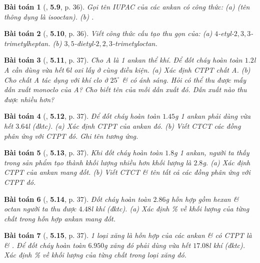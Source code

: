 \documentclass{article}
\numberwithin{equation}{section}
\newtheorem{baitoan}{Bài toán}[section]
\begin{document}
\begin{baitoan}[\cite{SBT_Hoa_Hoc_11_co_ban}, \textbf{5.9}, p. 36]
	Gọi tên IUPAC của các ankan có công thức: (a) \emph{} (tên thông dụng là \emph{isooctan}). (b) \emph{}.
\end{baitoan}

\begin{baitoan}[\cite{SBT_Hoa_Hoc_11_co_ban}, \textbf{5.10}, p. 36]
	Viết công thức cấu tạo thu gọn của: (a) $4$-etyl-$2,3,3$-trimetylheptan. (b) $3,5$-đietyl-$2,2,3$-trimetyloctan.
\end{baitoan}

\begin{baitoan}[\cite{SBT_Hoa_Hoc_11_co_ban}, \textbf{5.11}, p. 37]
	Cho A là 1 ankan thể khí. Để đốt cháy hoàn toàn $1.2$\emph{l} A cần dùng vừa hết $6$\emph{l} oxi lấy ở cùng điều kiện. (a) Xác định CTPT chất A. (b) Cho chất A tác dụng với khí clo ở $25^\circ$ \& có ánh sáng. Hỏi có thể thu được mấy dẫn xuất monoclo của A? Cho biết tên của mỗi dẫn xuất đó. Dẫn xuất nào thu được nhiều hơn?
\end{baitoan}

\begin{baitoan}[\cite{SBT_Hoa_Hoc_11_co_ban}, \textbf{5.12}, p. 37]
	Để đốt cháy hoàn toàn $1.45$\emph{g} 1 ankan phải dùng vừa hết $3.64$\emph{l} \emph{} (đktc). (a) Xác định CTPT của ankan đó. (b) Viết CTCT các đồng phân ứng với CTPT đó. Ghi tên tương ứng.
\end{baitoan}

\begin{baitoan}[\cite{SBT_Hoa_Hoc_11_co_ban}, \textbf{5.13}, p. 37]
	Khi đốt cháy hoàn toàn $1.8$\emph{g} 1 ankan, người ta thấy trong sản phẩm tạo thành khối lượng \emph{} nhiều hơn khối lượng \emph{} là $2.8$\emph{g}. (a) Xác định CTPT của ankan mang đốt. (b) Viết CTCT \& tên tất cả các đồng phân ứng với CTPT đó.
\end{baitoan}

\begin{baitoan}[\cite{SBT_Hoa_Hoc_11_co_ban}, \textbf{5.14}, p. 37]
	Đốt cháy hoàn toàn $2.86$\emph{g} hỗn hợp gồm hexan \& octan người ta thu được $4.48$\emph{l} khí \emph{} (đktc). (a) Xác định \% về khối lượng của từng chất trong hỗn hợp ankan mang đốt.
\end{baitoan}

\begin{baitoan}[\cite{SBT_Hoa_Hoc_11_co_ban}, \textbf{5.15}, p. 37]
	1 loại xăng là hỗn hợp của các ankan \& có CTPT là \emph{} \& \emph{}. Để đốt cháy hoàn toàn $6.950$\emph{g} xăng đó phải dùng vừa hết $17.08$\emph{l} khí \emph{} (đktc). Xác định \% về khối lượng của từng chất trong loại xăng đó. 
\end{baitoan}
\end{document}
